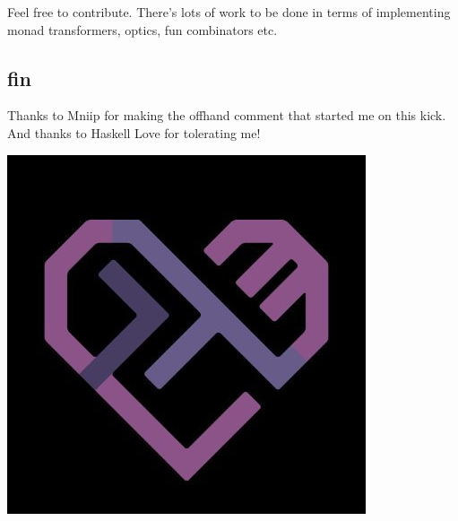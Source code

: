 \documentclass[tikz]{beamer}
\theoremstyle{definition}
\begin{document}
\frame
{
	Feel free to contribute. There's lots of work to be done in terms of implementing monad transformers, optics, fun combinators etc. 
}

\subsection{fin}
\frame
{
	Thanks to Mniip for making the offhand comment that started me on this kick. And thanks to Haskell Love for tolerating me!
	\newline
	\begin{center}
		\includegraphics[scale=0.35]{haskell_love}
	\end{center}
	 
}
\end{document}
